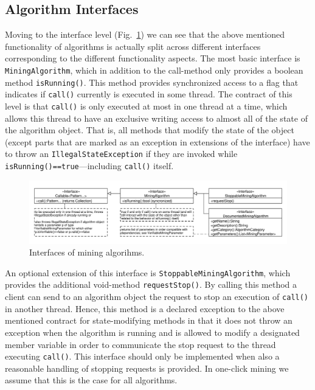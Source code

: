 \documentclass{scrartcl}
\newcommand{\class}[1]{\texttt{#1}}
\begin{document}
\subsection{Algorithm Interfaces}
Moving to the interface level (Fig.~\ref{fig:alg_interfaces}) we can see
that the above mentioned functionality of algorithms is actually split across
different interfaces corresponding to the different functionality aspects.
The most basic interface is \class{MiningAlgorithm}, which in addition to the
call-method only provides a boolean method \class{isRunning()}.
This method provides synchronized access to a flag that
indicates if \class{call()} currently is executed in some thread. 
The contract of this level is that \class{call()} is only executed at most in
one thread at a time, which allows this thread to have an exclusive
writing access to almost all of the state of the algorithm object. That is, all
methods that modify the state of the object (except parts that are marked as an
exception in extensions of the interface) have to throw an
\class{IllegalStateException} if they are invoked while
\class{isRunning()==true}---including \class{call()} itself.

\begin{figure}[ht]
\includegraphics[width=\columnwidth]{mining/algorithms_interfaces.pdf}
\caption{Interfaces of mining algorihms.}
\label{fig:alg_interfaces}
\end{figure}
An optional extension of this interface is \class{StoppableMiningAlgorithm},
which provides the additional void-method \class{requestStop()}. By calling this
method a client can send to an algorithm object the request to stop an execution
of \class{call()} in another thread. Hence, this method is a declared exception
to the above mentioned contract for state-modifying methods in that it does not
throw an exception when the algorithm is running and is allowed to modify a
designated member variable in order to communicate the stop
request to the thread executing \class{call()}. This interface should only be
implemented when also a reasonable handling of stopping requests is provided. In
one-click mining we assume that this is the case for all algorithms.	
\end{document}

